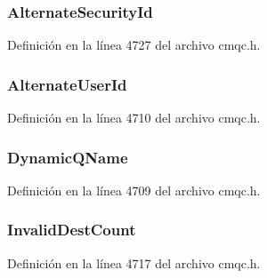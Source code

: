 \subsubsection[{Alternate\+Security\+Id}]{ Alternate\+Security\+Id}\label{structtag_m_q_o_d_adc1f3b4aa3c6e3f3187e75291146cae7}


Definición en la línea 4727 del archivo cmqc.\+h.

\hypertarget{structtag_m_q_o_d_aa4de0947b84fe1c303c8a5a419ef024a}{}
\subsubsection[{Alternate\+User\+Id}]{ Alternate\+User\+Id}\label{structtag_m_q_o_d_aa4de0947b84fe1c303c8a5a419ef024a}


Definición en la línea 4710 del archivo cmqc.\+h.

\hypertarget{structtag_m_q_o_d_afc3f01c1aa256275bb086469bc1bae95}{}
\subsubsection[{Dynamic\+Q\+Name}]{ Dynamic\+Q\+Name}\label{structtag_m_q_o_d_afc3f01c1aa256275bb086469bc1bae95}


Definición en la línea 4709 del archivo cmqc.\+h.

\hypertarget{structtag_m_q_o_d_af76c4c4a710793e086829eac1c995d36}{}
\subsubsection[{Invalid\+Dest\+Count}]{ Invalid\+Dest\+Count}\label{structtag_m_q_o_d_af76c4c4a710793e086829eac1c995d36}


Definición en la línea 4717 del archivo cmqc.\+h.

\hypertarget{structtag_m_q_o_d_ab63679527a2a808aa8c189eeca5d0712}{}
